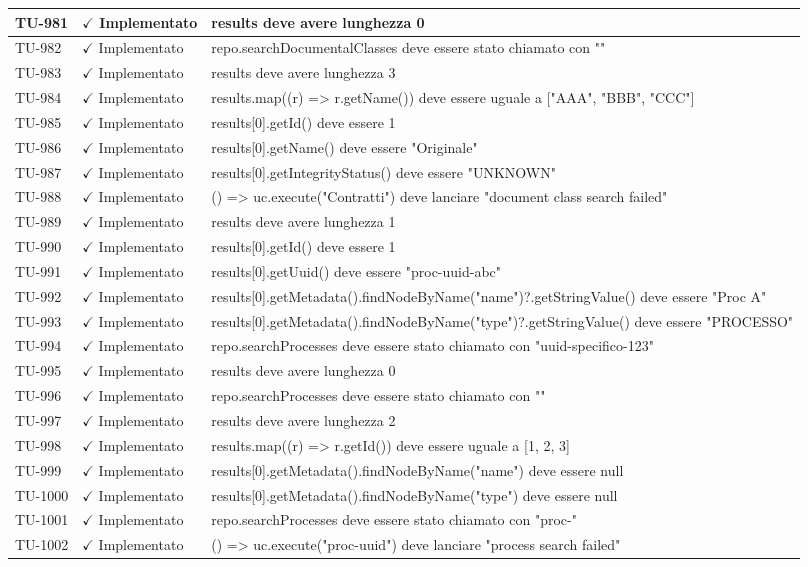 ﻿\documentclass[a4paper,12pt]{article}
\newcommand{\ok}{\textcolor{green!60!black}{$\checkmark$ Implementato}}
\begin{document}
\begin{longtable}{|p{2cm}|p{3.5cm}|p{9.5cm}|}
\hline
TU-981 & \ok & results deve avere lunghezza 0 \\
\hline
TU-982 & \ok & repo.searchDocumentalClasses deve essere stato chiamato con "" \\
\hline
TU-983 & \ok & results deve avere lunghezza 3 \\
\hline
TU-984 & \ok & results.map((r) => r.getName()) deve essere uguale a ["AAA", "BBB", "CCC"] \\
\hline
TU-985 & \ok & results[0].getId() deve essere 1 \\
\hline
TU-986 & \ok & results[0].getName() deve essere "Originale" \\
\hline
TU-987 & \ok & results[0].getIntegrityStatus() deve essere "UNKNOWN" \\
\hline
TU-988 & \ok & () => uc.execute("Contratti") deve lanciare "document class search failed" \\
\hline
TU-989 & \ok & results deve avere lunghezza 1 \\
\hline
TU-990 & \ok & results[0].getId() deve essere 1 \\
\hline
TU-991 & \ok & results[0].getUuid() deve essere "proc-uuid-abc" \\
\hline
TU-992 & \ok & results[0].getMetadata().findNodeByName("name")?.getStringValue() deve essere "Proc A" \\
\hline
TU-993 & \ok & results[0].getMetadata().findNodeByName("type")?.getStringValue() deve essere "PROCESSO" \\
\hline
TU-994 & \ok & repo.searchProcesses deve essere stato chiamato con "uuid-specifico-123" \\
\hline
TU-995 & \ok & results deve avere lunghezza 0 \\
\hline
TU-996 & \ok & repo.searchProcesses deve essere stato chiamato con "" \\
\hline
TU-997 & \ok & results deve avere lunghezza 2 \\
\hline
TU-998 & \ok & results.map((r) => r.getId()) deve essere uguale a [1, 2, 3] \\
\hline
TU-999 & \ok & results[0].getMetadata().findNodeByName("name") deve essere null \\
\hline
TU-1000 & \ok & results[0].getMetadata().findNodeByName("type") deve essere null \\
\hline
TU-1001 & \ok & repo.searchProcesses deve essere stato chiamato con "proc-" \\
\hline
TU-1002 & \ok & () => uc.execute("proc-uuid") deve lanciare "process search failed" \\

\end{longtable}
\end{document}
